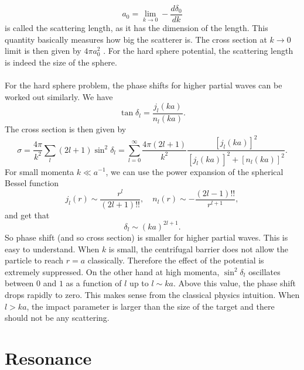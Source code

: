\[a_0 = \lim_{k \to 0} -\frac{d\delta_0}{dk}\]
is called the scattering length, as it has the dimension of the length. This quantity basically measures how big the scatterer is. The cross section at $k \to 0$ limit is then given by $4\pi a_0^2$ . For the hard sphere potential, the scattering length is indeed the size of the sphere.
\\ \\
For the hard sphere problem, the phase shifts for higher partial waves can be worked out similarly. We have
\[\tan\delta_l = \frac{j_l(ka)}{n_l(ka)}.\]
The cross section is then given by
\[\sigma = \frac{4\pi}{k^2} \sum_l (2l+1) \sin^2\delta_l = \sum_{l=0}^{\infty} \frac{4\pi(2l+1)}{k^2} \frac{[j_l(ka)]^2}{[j_l(ka)]^2+[n_l(ka)]^2}.\]
For small momenta $k \ll a^{-1}$, we can use the power expansion of the spherical Bessel function
\[j_l(r) \sim \frac{r^{l}}{(2l+1)!!} , \quad n_l(r) \sim -\frac{(2l-1)!!}{r^{l+1}},\]
and get that
\[\delta_l \sim (ka)^{2l+1}.\]
So phase shift (and so cross section) is smaller for higher partial waves. This is easy to understand. When $k$ is small, the centrifugal barrier does not allow the particle to reach $r=a$ classically. Therefore the effect of the potential is extremely suppressed.
On the other hand at high momenta, $\sin^2\delta_l$ oscillates between $0$ and $1$ as a function of $l$ up to $l \sim ka$. Above this value, the phase shift drops rapidly to zero. This makes sense from the classical physics intuition. When $l > ka$,
the impact parameter is larger than the size of the target and there should not be any scattering.

\section{Resonance}
